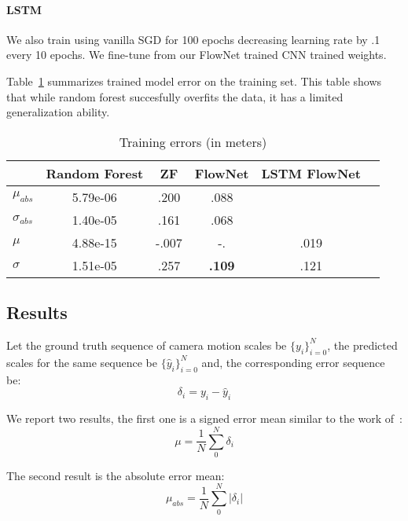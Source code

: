 \paragraph{LSTM} We also train using vanilla SGD for 100 epochs
decreasing learning rate by .1 every 10 epochs.  We fine-tune from our
FlowNet trained CNN trained weights.

Table~\ref{table:train result} summarizes trained model error on the
training set.  This table shows that while random forest succesfully
overfits the data, it has a limited generalization ability.

\begin{table}[ht]
  \centering
  \begin{tabular}{ lccccc }
    \hline
                       & Random Forest & ZF   & FlowNet          & LSTM FlowNet \\
    \hline
    $\mu_{abs}$        & 5.79e-06      & .200 & .088    &  \\
    $\sigma_{abs}$     & 1.40e-05      & .161 & .068    &  \\
    $\mu$              & 4.88e-15      &-.007 & -.    & .019  \\
    $\sigma$           & 1.51e-05      & .257 & \textbf{.109}    & .121  \\
    \hline
  \end{tabular}
  \caption{Training errors (in meters)}
  \label{table:train result}
\end{table}

\subsection{Results}\label{sec:results}

Let the ground truth sequence of camera motion scales be
$\{y_i\}_{i=0}^N$, the predicted scales for the same sequence be
$\{\hat{y}_i\}_{i=0}^N$ and, the corresponding error sequence be:
\begin{equation}
  \delta_i = y_i-\hat{y}_i
\end{equation}

We report two results, the first one is a signed error mean similar to
the work of~\cite{frost2017using}:
\begin{equation}
  \mu = \frac{1}{N}\sum_0^N{\delta_i}
\end{equation}

The second result is the absolute error mean:
\begin{equation}
  \mu_{abs} = \frac{1}{N}\sum_0^N{|\delta_i|}
\end{equation}

